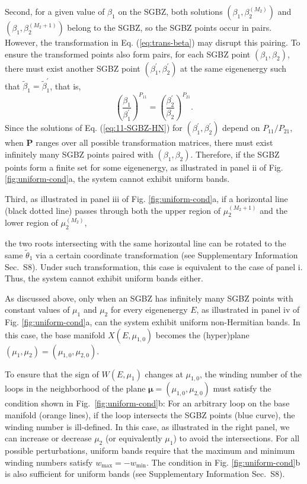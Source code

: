 \documentclass[pdflatex,sn-nature,iicol]{sn-jnl}
\theoremstyle{thmstyleone}%
\theoremstyle{thmstyletwo}%
\theoremstyle{thmstylethree}%
\begin{document}
Second, for a given value of $\beta_{1}$ on the SGBZ, both solutions
$(\beta_{1},\beta_{2}^{(M_{2})})$ and $(\beta_{1},\beta_{2}^{(M_{2}+1)})$
belong to the SGBZ, so the SGBZ points occur in pairs. However, the
transformation in Eq. (\ref{eq:trans-beta}) may disrupt this pairing.
To ensure the transformed points also form pairs, for each SGBZ point
$(\beta_{1},\beta_{2})$, there must exist another SGBZ point $(\beta_{1}^{\prime},\beta_{2}^{\prime})$
at the same eigenenergy such that $\tilde{\beta}_{1}=\tilde{\beta}_{1}^{\prime}$,
that is, 
\begin{equation}
\left(\frac{\beta_{1}}{\beta_{1}^{\prime}}\right)^{P_{11}}=\left(\frac{\beta_{2}^{\prime}}{\beta_{2}}\right)^{P_{21}}.\label{eq:beta-pairing}
\end{equation}
Since the solutions of Eq. (\ref{eq:11-SGBZ-HN}) for $(\beta_{1}^{\prime},\beta_{2}^{\prime})$
depend on $P_{11}/P_{21}$, when $\mathbf{P}$ ranges over all possible
transformation matrices, there must exist infinitely many SGBZ points
paired with $(\beta_{1},\beta_{2})$. Therefore, if the SGBZ points
form a finite set for some eigenenergy, as illustrated in panel ii
of Fig. \ref{fig:uniform-cond}a, the system cannot exhibit uniform
bands.

Third, as illustrated in panel iii of Fig. \ref{fig:uniform-cond}a,
if a horizontal line (black dotted line) passes through both the upper
region of $\mu_{2}^{(M_{2}+1)}$ and the lower region of $\mu_{2}^{(M_{2})}$,

the two roots intersecting with the same horizontal line can be rotated to the same $\tilde{\theta}_1$ via a certain coordinate transformation (see Supplementary Information Sec.~S8). Under such transformation, this case is equivalent to the case of panel i. Thus, the system cannot exhibit uniform bands either.


As discussed above, only when an SGBZ has infinitely many SGBZ points
with constant values of $\mu_{1}$ and $\mu_{2}$ for every eigenenergy
$E$, as illustrated in panel iv of Fig. \ref{fig:uniform-cond}a,
can the system exhibit uniform non-Hermitian bands. In this case,
the base manifold $X(E,\mu_{1,0})$ becomes the (hyper)plane $(\mu_{1},\mu_{2})=(\mu_{1,0},\mu_{2,0})$.
 
To ensure that the sign of $W(E,\mu_1)$ changes at $\mu_{1,0}$, the winding number of the loops in the neighborhood of the plane $\boldsymbol{\mu} = (\mu_{1,0},\mu_{2,0})$ must satisfy the condition shown in Fig.~\ref{fig:uniform-cond}b:
For an arbitrary loop on
the base manifold (orange lines), if the loop intersects the SGBZ
points (blue curve), the winding number is ill-defined. In this case,
as illustrated in the right panel, we can increase or decrease $\mu_{2}$
(or equivalently $\mu_{1}$) to avoid the intersections. For all possible
perturbations, uniform bands require that the maximum and minimum
winding numbers satisfy $w_{\text{max}}=-w_{\text{min}}$. The condition
in Fig. \ref{fig:uniform-cond}b is also sufficient for uniform bands (see Supplementary Information Sec.~S8).
\end{document}
